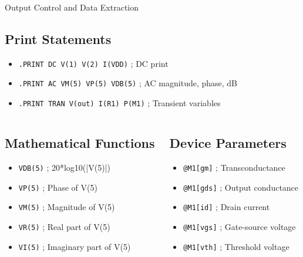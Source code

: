 \documentclass{beamer}
\begin{document}
\begin{frame}{Output Control and Data Extraction}
    \subsection{Print Statements}
    \begin{itemize}
        \item \texttt{.PRINT DC V(1) V(2) I(VDD)} ; DC print
        \item \texttt{.PRINT AC VM(5) VP(5) VDB(5)} ; AC magnitude, phase, dB
        \item \texttt{.PRINT TRAN V(out) I(R1) P(M1)} ; Transient variables
    \end{itemize}
    
    \begin{columns}
        \begin{column}{0.5\textwidth}
            \subsection{Mathematical Functions}
            \begin{itemize}
                \item \texttt{VDB(5)} ; 20*log10(|V(5)|)
                \item \texttt{VP(5)} ; Phase of V(5)
                \item \texttt{VM(5)} ; Magnitude of V(5)
                \item \texttt{VR(5)} ; Real part of V(5)
                \item \texttt{VI(5)} ; Imaginary part of V(5)
            \end{itemize}
        \end{column}
        \begin{column}{0.5\textwidth}
            \subsection{Device Parameters}
            \begin{itemize}
                \item \texttt{@M1[gm]} ; Transconductance
                \item \texttt{@M1[gds]} ; Output conductance
                \item \texttt{@M1[id]} ; Drain current
                \item \texttt{@M1[vgs]} ; Gate-source voltage
                \item \texttt{@M1[vth]} ; Threshold voltage
            \end{itemize}
        \end{column}
    \end{columns}
\end{frame}
\end{document}
